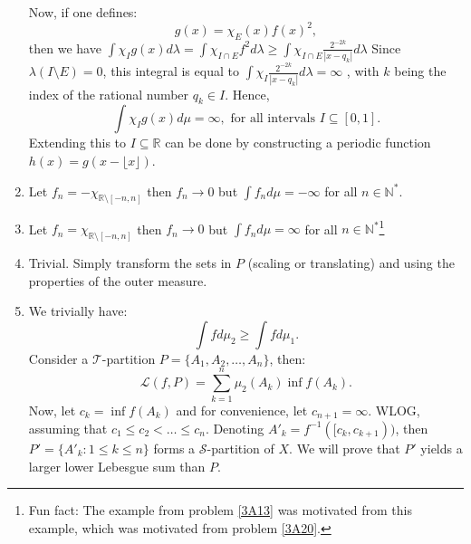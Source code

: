 \begin{enumerate}[label=\textbf{3A.\arabic*}]
    Now, if one defines:
    \[
      g(x) = \chi_{E}(x) f(x)^2
    ,\] then we have \( \int \chi_{I}g(x) d \lambda = \int \chi_{I \cap E}
    f^2d\lambda \ge \int \chi_{I \cap E}
    \frac{2^{-2k}}{|x-q_{k}|} d\lambda \) Since \( \lambda (I \setminus E) = 0 \), this
    integral is equal to \( \int \chi_{I} \frac{2^{-2k}}{|x-q_{k}|} d\lambda = \infty \)
    , with \( k \) being the index of the rational number \( q_{k} \in I \).
    Hence,
    \[
      \int \chi_{I}g(x) d\mu  = \infty, \text{ for all intervals } I \subseteq
      [0, 1]
    .\] 
    Extending this to \( I \subseteq \mathbb{R} \) can be done by constructing a
    periodic function \( h(x) = g(x - \lfloor x\rfloor) \).
  \item \label{3A13} Let \( f_{n} = -\chi_{\mathbb{R} \setminus [-n, n]} \)  then \(
    f_{n} \to 0 \) but \( \int f_{n}d\mu = -\infty \) for all \( n \in
    \mathbb{N}^{*} \).
  \item Let \( f_{n} = \chi_{\mathbb{R} \setminus [-n, n]} \)  then \(
    f_{n} \to 0 \) but \( \int f_{n}d\mu = \infty \) for all \( n \in
    \mathbb{N}^{*} \)\footnote{Fun fact:
      The example from problem \ref{3A13} was motivated from
    this example, which was motivated from problem \ref{3A20}.}
  \item Trivial. Simply transform the sets in \( P \) (scaling or translating)
    and using the properties of the outer measure.
  \item \label{3A16}
    We trivially have:
    \[
      \int f d\mu_{2} \ge \int f d \mu_{1}
    .\] 
    Consider a \( \mathcal{T} \)-partition \( P = \{  A_{1}, A_{2}, \ldots,
    A_{n} \} \), then:
    \[
      \mathcal{L}(f, P) = \sum_{k = 1}^{n} \mu_{2}(A_{k}) \inf f(A_{k})
    .\] 
    Now, let \( c_{k} = \inf f(A_{k}) \) and for convenience, let \( c_{n + 1} =
    \infty\). WLOG, assuming that \( c_{1} \le  c_{2} < \ldots \le  c_{n} \).
    Denoting \( A'_{k} = f^{-1}([c_{k}, c_{k + 1})) \), then \(
    P' = \{A'_{k}: 1 \le k \le n\}   \) forms a \( \mathcal{S} \)-partition of
    \( X \). We will prove that \( P' \) yields a larger lower Lebesgue sum than
    \( P \).


\end{enumerate}
